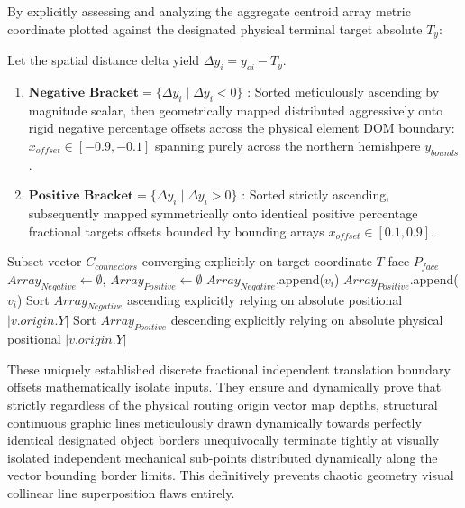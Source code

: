 \documentclass[fleqn,10pt]{wlscirep}
\begin{document}
By explicitly assessing and analyzing the aggregate centroid array metric coordinate plotted against the designated physical terminal target absolute $T_y$:

Let the spatial distance delta yield $\Delta y_i = y_{oi} - T_y$.
\begin{enumerate}
    \item $\textbf{Negative Bracket} = \{ \Delta y_i \mid \Delta y_i < 0 \}$ : Sorted meticulously ascending by magnitude scalar, then geometrically mapped distributed aggressively onto rigid negative percentage offsets across the physical element DOM boundary: $x_{offset} \in [-0.9, -0.1]$ spanning purely across the northern hemishpere $y_{bounds}$.
    \item $\textbf{Positive Bracket} = \{ \Delta y_i \mid \Delta y_i > 0 \}$ : Sorted strictly ascending, subsequently mapped symmetrically onto identical positive percentage fractional targets offsets bounded by bounding arrays $x_{offset} \in [0.1, 0.9]$.
\end{enumerate}

\begin{algorithm}[H]
\caption{Mathematical Affine Offsetting for Collinear Spreading Resolution}
\begin{algorithmic}[1]
\Require Subset vector $C_{connectors}$ converging explicitly on target coordinate $T$ face $P_{face}$
\State $Array_{Negative} \gets \emptyset$, $Array_{Positive} \gets \emptyset$
        \State $Array_{Negative}$.append($v_i$)
    \Else
        \State $Array_{Positive}$.append($v_i$)
    \EndIf
\EndFor
\State Sort $Array_{Negative}$ ascending explicitly relying on absolute positional $|v.origin.Y|$
\State Sort $Array_{Positive}$ descending explicitly relying on absolute physical positional $|v.origin.Y|$
\State {}
\end{algorithmic}
\label{alg:spreading}
\end{algorithm}

These uniquely established discrete fractional independent translation boundary offsets mathematically isolate inputs. They ensure and dynamically prove that strictly regardless of the physical routing origin vector map depths, structural continuous graphic lines meticulously drawn dynamically towards perfectly identical designated object borders unequivocally terminate tightly at visually isolated independent mechanical sub-points distributed dynamically along the vector bounding border limits. This definitively prevents chaotic geometry visual collinear line superposition flaws entirely.
\end{document}
